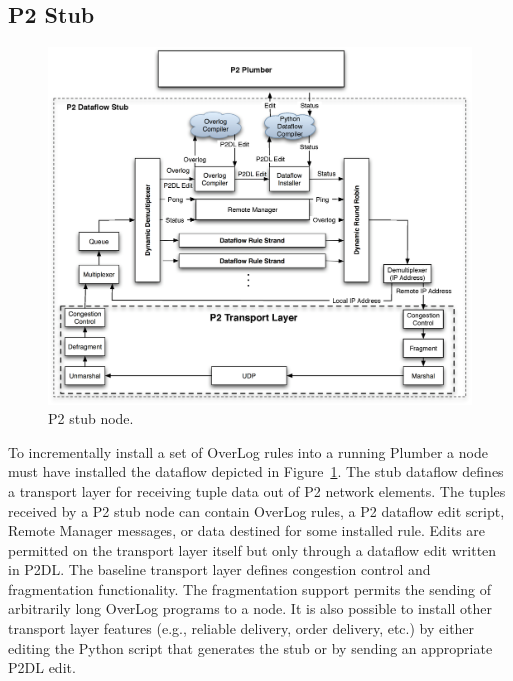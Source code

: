 \documentclass[12pt]{article}
\begin{document}
\subsection{P2 Stub}
\label{sec:p2stub}

\begin{figure}[htbp] %
   \centering
   \includegraphics[width=6in]{p2stub.eps} 
   \caption{P2 stub node.}
   \label{fig:p2stub}
\end{figure}

To incrementally install a set of OverLog rules into a running Plumber a node must have
installed the dataflow depicted in Figure~\ref{fig:p2stub}. The stub dataflow defines a transport layer
for receiving tuple data out of P2 network elements. The tuples received by a P2 stub node
can contain OverLog rules, a P2 dataflow edit script, Remote Manager messages,
or data destined for some installed rule. Edits are permitted on the transport layer itself but only
through a dataflow edit written in P2DL. The baseline transport layer defines congestion control and fragmentation functionality. The fragmentation support permits the sending of arbitrarily long 
OverLog programs to a node. It is also possible to install other transport layer features (e.g., reliable delivery,
order delivery, etc.) by either editing the Python script that generates the stub or by
sending an appropriate P2DL edit. 
\end{document}
